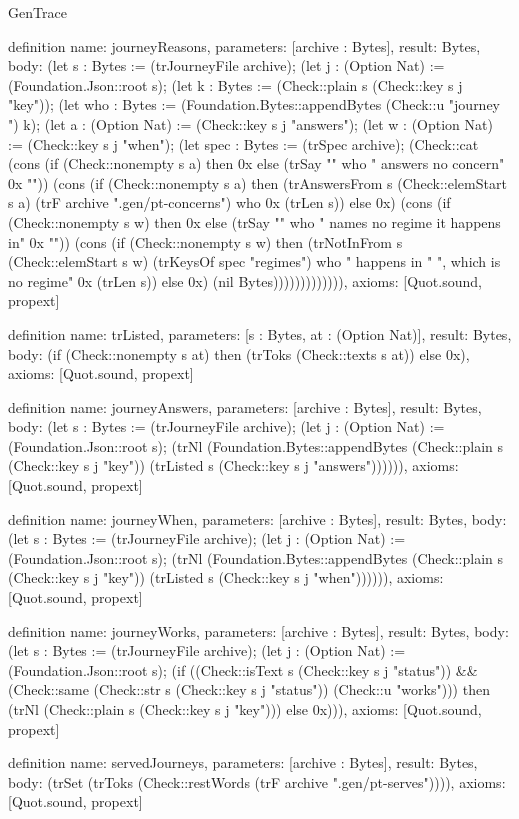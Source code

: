 \begin{lexlean}{GenTrace}
\begin{semanticmodule}
definition{
  name: journeyReasons,
  parameters: [archive : Bytes],
  result: Bytes,
  body: (let s : Bytes := (trJourneyFile archive); (let j : (Option Nat) := (Foundation.Json::root s); (let k : Bytes := (Check::plain s (Check::key s j "key")); (let who : Bytes := (Foundation.Bytes::appendBytes (Check::u "journey ") k); (let a : (Option Nat) := (Check::key s j "answers"); (let w : (Option Nat) := (Check::key s j "when"); (let spec : Bytes := (trSpec archive); (Check::cat (cons (if (Check::nonempty s a) then 0x else (trSay "" who " answers no concern" 0x "")) (cons (if (Check::nonempty s a) then (trAnswersFrom s (Check::elemStart s a) (trF archive ".gen/pt-concerns") who 0x (trLen s)) else 0x) (cons (if (Check::nonempty s w) then 0x else (trSay "" who " names no regime it happens in" 0x "")) (cons (if (Check::nonempty s w) then (trNotInFrom s (Check::elemStart s w) (trKeysOf spec "regimes") who " happens in " ", which is no regime" 0x (trLen s)) else 0x) (nil Bytes))))))))))))),
  axioms: [Quot.sound, propext]
}

definition{
  name: trListed,
  parameters: [s : Bytes, at : (Option Nat)],
  result: Bytes,
  body: (if (Check::nonempty s at) then (trToks (Check::texts s at)) else 0x),
  axioms: [Quot.sound, propext]
}

definition{
  name: journeyAnswers,
  parameters: [archive : Bytes],
  result: Bytes,
  body: (let s : Bytes := (trJourneyFile archive); (let j : (Option Nat) := (Foundation.Json::root s); (trNl (Foundation.Bytes::appendBytes (Check::plain s (Check::key s j "key")) (trListed s (Check::key s j "answers")))))),
  axioms: [Quot.sound, propext]
}

definition{
  name: journeyWhen,
  parameters: [archive : Bytes],
  result: Bytes,
  body: (let s : Bytes := (trJourneyFile archive); (let j : (Option Nat) := (Foundation.Json::root s); (trNl (Foundation.Bytes::appendBytes (Check::plain s (Check::key s j "key")) (trListed s (Check::key s j "when")))))),
  axioms: [Quot.sound, propext]
}

definition{
  name: journeyWorks,
  parameters: [archive : Bytes],
  result: Bytes,
  body: (let s : Bytes := (trJourneyFile archive); (let j : (Option Nat) := (Foundation.Json::root s); (if ((Check::isText s (Check::key s j "status")) && (Check::same (Check::str s (Check::key s j "status")) (Check::u "works"))) then (trNl (Check::plain s (Check::key s j "key"))) else 0x))),
  axioms: [Quot.sound, propext]
}

definition{
  name: servedJourneys,
  parameters: [archive : Bytes],
  result: Bytes,
  body: (trSet (trToks (Check::restWords (trF archive ".gen/pt-serves")))),
  axioms: [Quot.sound, propext]
}


\end{semanticmodule}
\end{lexlean}
